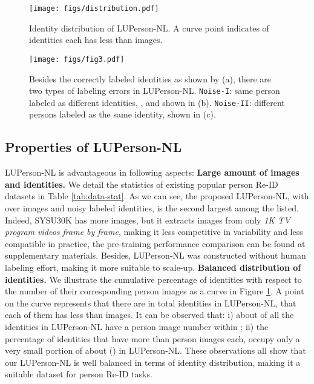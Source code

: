 \documentclass[10pt,twocolumn,letterpaper]{article}
\begin{document}
\begin{figure}[t]
\begin{center}
    \texttt{[image: figs/distribution.pdf]}
\end{center}
\caption{Identity distribution of LUPerson-NL. A curve point  indicates  of identities each has less than  images.}
\label{fig:hist}
\end{figure}



\begin{figure}[t]
\begin{center}
\texttt{[image: figs/fig3.pdf]}
\end{center}
\vspace{-0.7cm}
\caption{Besides the correctly labeled identities as shown by (a), there are two types of labeling errors in LUPerson-NL. \texttt{Noise-I}: same person labeled as different identities, \eg ,  and  shown in (b). \texttt{Noise-II}: different persons labeled as the same identity, \eg  shown in (c).}
\label{fig:lup-ws}
\end{figure}

\subsection{Properties of LUPerson-NL}


LUPerson-NL is advantageous in following aspects:
\noindent\textbf{Large amount of images and identities.} 
We detail the statistics of existing popular person Re-ID datasets in Table \ref{tab:data-stat}.
As we can see, the proposed LUPerson-NL, with over  images and  noisy labeled identities, is the second largest among the listed. Indeed, SYSU30K has more images, but it extracts images from only \textit{1K TV program videos frame by frame}, making it less competitive in variability and less compatible in practice, the pre-training performance comparison can be found at supplementary materials. Besides, LUPerson-NL was constructed without human labeling effort, making it more suitable to scale-up. 
\noindent\textbf{Balanced distribution of identities.} 
We illustrate the cumulative percentage of identities with respect to the number of their corresponding person images as a curve in Figure \ref{fig:hist}.
A point  on the curve represents that there are in total  identities in LUPerson-NL, that each of them has less than  images.
It can be observed that: 
i) about  of all the identities in LUPerson-NL have a person image number within ;
ii) the percentage of identities that have more than  person images each, occupy only a very small portion of about  () in LUPerson-NL.
These observations all show that our LUPerson-NL is well balanced in terms of identity distribution, making it a suitable dataset for person Re-ID tasks.
\end{document}

